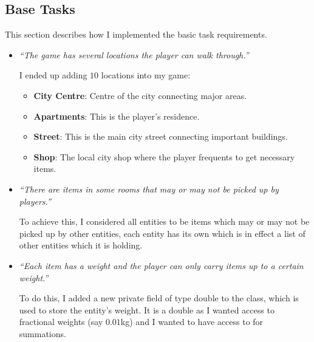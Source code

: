 \documentclass{article}
\begin{document}
\begin{multicols}{2}

        \section{Base Tasks}

            This section describes how I implemented the basic task requirements.

            \begin{itemize}[leftmargin=*]
                \item \textit{``The game has several locations the player can walk through.''}
                
                    I ended up adding $10$ locations into my game:
                    \begin{itemize}[leftmargin=*]
                        \item \textbf{City Centre}: Centre of the city connecting major areas.
                        \item \textbf{Apartments}: This is the player's residence.
                        \item \textbf{Street}: This is the main city street connecting important buildings.
                        \item \textbf{Shop}: The local city shop where the player frequents to get necessary items.
                    \end{itemize}

                \item \textit{``There are items in some rooms that may or may not be picked up by players.''}
                
                    To achieve this, I considered all entities to be items which may or may not be picked up by other entities, each entity has its own  which is in effect a list of other entities which it is holding.
                
                \item \textit{``Each item has a weight and the player can only carry items up to a certain weight.''}
                
                    To do this, I added a new private field  of type double to the  class, which is used to store the entity's weight. It is a double as I wanted access to fractional weights (say $0.01$kg) and I wanted to have access to  for summations.


\end{itemize}
\end{multicols}
\end{document}
